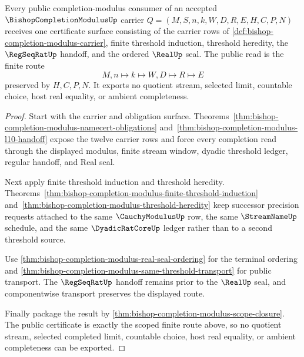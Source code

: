 \begin{theorem}
\label{thm:bishop-completion-modulus-public-completion-certificate}
Every public completion-modulus consumer of an accepted $\BishopCompletionModulusUp$ carrier $Q=(M,S,n,k,W,D,R,E,H,C,P,N)$ receives one certificate surface consisting of the carrier rows of \autoref{def:bishop-completion-modulus-carrier}, finite threshold induction, threshold heredity, the $\RegSeqRatUp$ handoff, and the ordered $\RealUp$ seal. The public read is the finite route
$$
M,n \longmapsto k \longmapsto W,D \longmapsto R \longmapsto E
$$
preserved by $H,C,P,N$. It exports no quotient stream, selected limit, countable choice, host real equality, or ambient completeness.
\end{theorem}
\begin{proof}
Start with the carrier and obligation surface. Theorems~\ref{thm:bishop-completion-modulus-namecert-obligations} and~\ref{thm:bishop-completion-modulus-l10-handoff} expose the twelve carrier rows and force every completion read through the displayed modulus, finite stream window, dyadic threshold ledger, regular handoff, and Real seal.

Next apply finite threshold induction and threshold heredity. Theorems~\ref{thm:bishop-completion-modulus-finite-threshold-induction} and~\ref{thm:bishop-completion-modulus-threshold-heredity} keep successor precision requests attached to the same $\CauchyModulusUp$ row, the same $\StreamNameUp$ schedule, and the same $\DyadicRatCoreUp$ ledger rather than to a second threshold source.

Use \autoref{thm:bishop-completion-modulus-real-seal-ordering} for the terminal ordering and \autoref{thm:bishop-completion-modulus-same-threshold-transport} for public transport. The $\RegSeqRatUp$ handoff remains prior to the $\RealUp$ seal, and componentwise transport preserves the displayed route.

Finally package the result by \autoref{thm:bishop-completion-modulus-scope-closure}. The public certificate is exactly the scoped finite route above, so no quotient stream, selected completed limit, countable choice, host real equality, or ambient completeness can be exported.
\end{proof}


